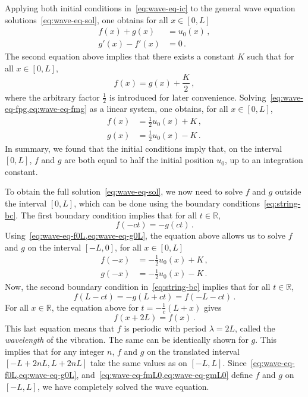 Applying both initial conditions in~\cref{eq:wave-eq-ic} to the general wave equation
solutions~\cref{eq:wave-eq-sol}, one obtains for all $x\in[0,L]$
\begin{align}
  f(x)+g(x)&=u_0(x)\label{eq:wave-eq-fpg}\,,\\
  g'(x)-f'(x)&=0\,.
\end{align}
The second equation above implies that there exists a constant $K$ such that for all
$x\in[0,L]$,
\begin{equation}
  f(x)=g(x)+\frac{K}{2}\,,\label{eq:wave-eq-fmg}
\end{equation}
where the arbitrary factor $\frac12$ is introduced for later convenience.
Solving~\cref{eq:wave-eq-fpg,eq:wave-eq-fmg} as a linear system, one obtains, for all
$x\in[0,L]$,
\begin{align}
  f(x)&=\frac{1}{2}u_0(x)+K\,,\label{eq:wave-eq-f0L}\\
  g(x)&=\frac{1}{2}u_0(x)-K\,.\label{eq:wave-eq-g0L}
\end{align}
In summary, we found that the initial conditions imply that, on the interval $[0,L]$, $f$
and $g$ are both equal to half the initial position $u_0$, up to an integration constant.

To obtain the full solution~\cref{eq:wave-eq-sol}, we now need to solve $f$ and $g$
outside the interval $[0,L]$, which can be done using the boundary
conditions~\cref{eq:string-bc}. The first boundary condition implies that for all
$t\in\mathbb{R}$,
\begin{equation}
  f(-ct)=-g(ct)\,.
\end{equation}
Using~\cref{eq:wave-eq-f0L,eq:wave-eq-g0L}, the equation above allows us to solve $f$ and
$g$ on the interval $[-L,0]$, \ie for all $x\in[0,L]$
\begin{align}
  f(-x)&=-\frac{1}{2}u_0(x)+K\,,\label{eq:wave-eq-fmL0}\\
  g(-x)&=-\frac{1}{2}u_0(x)-K\,.\label{eq:wave-eq-gmL0}
\end{align}
Now, the second boundary condition in~\cref{eq:string-bc} implies that for all
$t\in\mathbb{R}$,
\begin{equation}
  f(L-ct)=-g(L+ct)=f(-L-ct)\,.
\end{equation}
For all $x\in\mathbb{R}$, the equation above for $t=-\frac{1}{c}(L+x)$ gives
\begin{equation}
  f(x+2L)=f(x)\,.
\end{equation}
This last equation means that $f$ is periodic with period $\lambda=2L$, called the
\emph{wavelength} of the vibration. The same can be identically shown for $g$. This
implies that for any integer $n$, $f$ and $g$ on the translated interval $[-L+2nL,L+2nL]$
take the same values as on $[-L,L]$. Since~\cref{eq:wave-eq-f0L,eq:wave-eq-g0L},
and~\cref{eq:wave-eq-fmL0,eq:wave-eq-gmL0} define $f$ and $g$ on $[-L,L]$, we have
completely solved the wave equation.

